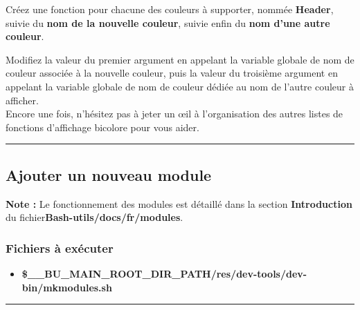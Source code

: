 \documentclass[a4paper,10pt]{article}
\begin{document}
\begin{justify}
	Créez une fonction pour chacune des couleurs à supporter, nommée \textbf{\color{mauve}Header}, suivie du \textbf{\color{mauve}nom de la nouvelle couleur}, suivie enfin du \textbf{\color{mauve}nom d'une autre couleur}.
\end{justify}

Modifiez la valeur du premier argument en appelant la variable globale de nom de couleur associée à la nouvelle couleur, puis la valeur du troisième argument en appelant la variable globale de nom de couleur dédiée au nom de l'autre couleur à afficher.\\[1\baselineskip]

Encore une fois, n'hésitez pas à jeter un œil à l'organisation des autres listes de fonctions d'affichage\linebreak
bicolore pour vous aider.\\[1\baselineskip]




\color{green}\par\noindent\rule{\textwidth}{0.4pt}\color{white}

\color{green}
\subsection{Ajouter un nouveau module}\color{white}

\textbf{Note :} Le fonctionnement des modules est détaillé dans la section \textbf{\color{red}Introduction} du fichier\linebreak \textbf{\color{lime}Bash-utils/docs/fr/modules}.

\color{blue}
\subsubsection{Fichiers à exécuter}\color{white}

\begin{itemize}
    \item \textbf{\color{orange}\$\_\_BU\_MAIN\_ROOT\_DIR\_PATH\color{lime}/res/dev-tools/dev-bin/mkmodules.sh}\\[1\baselineskip]
\end{itemize}



\color{blue}\par\noindent\rule{\textwidth}{0.4pt}\color{white}
\end{document}
